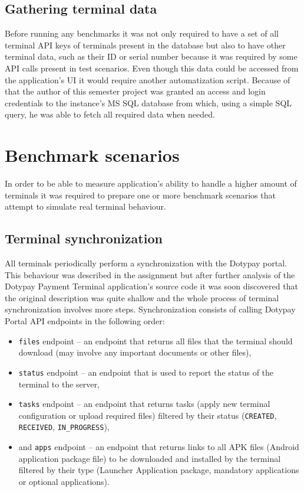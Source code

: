 \documentclass[12pt, a4paper]{article}
\let\oldsection\section
\renewcommand\section{\clearpage\oldsection}
\begin{document}
\subsection{Gathering terminal data}

Before running any benchmarks it was not only required to have a set of all terminal API keys of terminals present in the database but also to have other terminal data, such as their ID or serial number because it was required by some API calls present in test scenarios.
Even though this data could be accessed from the application's UI it would require another automatization script.
Because of that the author of this semester project was granted an access and login credentials to the instance's MS SQL database from which, using a simple SQL query, he was able to fetch all required data when needed.


\section{Benchmark scenarios}

In order to be able to measure application's ability to handle a higher amount of terminals it was required to prepare one or more benchmark scenarios that attempt to simulate real terminal behaviour.


\subsection{Terminal synchronization}

All terminals periodically perform a synchronization with the Dotypay portal.
This behaviour was described in the assignment but after further analysis of the Dotypay Payment Terminal application's source code it was soon discovered that the original description was quite shallow and the whole process of terminal synchronization involves more steps.
Synchronization consists of calling Dotypay Portal API endpoints in the following order:

\begin{itemize}
    \item \texttt{files} endpoint -- an endpoint that returns all files that the terminal should download (may involve any important documents or other files),
    \item \texttt{status} endpoint -- an endpoint that is used to report the status of the terminal to the server,
    \item \texttt{tasks} endpoint -- an endpoint that returns tasks (apply new terminal configuration or upload required files) filtered by their status (\texttt{CREATED}, \texttt{RECEIVED}, \texttt{IN\_PROGRESS}),
    \item and \texttt{apps} endpoint -- an endpoint that returns links to all APK files (Android application package file) to be downloaded and installed by the terminal filtered by their type (Launcher Application package, mandatory applications or optional applications).
\end{itemize}
\end{document}

